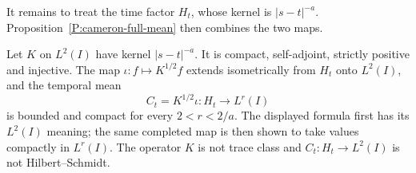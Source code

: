 It remains to treat the time factor $H_t$, whose kernel is $|s-t|^{-a}$.
Proposition~\ref{P:cameron-full-mean} then combines the two maps.
%
\begin{proposition}
  \label{P:cameron-temporal-map}
  Let $K$ on $L^2(I)$ have kernel $|s-t|^{-a}$. It is compact, self-adjoint,
  strictly positive and injective. The map $\iota:f\mapsto K^{1/2}f$ extends
  isometrically from $H_t$ onto $L^2(I)$, and the temporal mean
  \begin{equation}\label{E:cameron-temporal-map}
    C_t=K^{1/2}\iota:H_t\longrightarrow L^r(I)
  \end{equation}
  is bounded and compact for every $2 < r < 2/a$. The displayed formula first
  has its $L^2(I)$ meaning; the same completed map is then shown to take values
  compactly in $L^r(I)$. The operator $K$ is not trace class and $C_t:H_t \to
  L^2(I)$ is not Hilbert--Schmidt.
\end{proposition}

